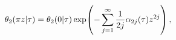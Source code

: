 \[\mathop{\theta_{2}\/}\nolimits\!\left(\pi z\middle|\tau\right)=\mathop{\theta_%
{2}\/}\nolimits\!\left(0\middle|\tau\right)\mathop{\exp\/}\nolimits\!\left(-%
\sum_{j=1}^{\infty}\frac{1}{2j}\alpha_{2j}(\tau)z^{2j}\right),\]